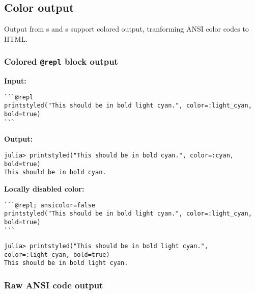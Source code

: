 \subsection{Color output}



\label{17347250707405175741}{}


Output from s and s support colored output, tranforming ANSI color codes to HTML.



\subsubsection{Colored \texttt{@repl} block output}



\label{681009610151884915}{}


\textbf{Input:}




\begin{lstlisting}
```@repl
printstyled("This should be in bold light cyan.", color=:light_cyan, bold=true)
```
\end{lstlisting}



\textbf{Output:}




\begin{verbatim}
julia> printstyled("This should be in bold cyan.", color=:cyan, bold=true)
This should be in bold cyan.
\end{verbatim}



\textbf{Locally disabled color:}




\begin{lstlisting}
```@repl; ansicolor=false
printstyled("This should be in bold light cyan.", color=:light_cyan, bold=true)
```
\end{lstlisting}




\begin{verbatim}
julia> printstyled("This should be in bold light cyan.", color=:light_cyan, bold=true)
This should be in bold light cyan.
\end{verbatim}



\subsubsection{Raw ANSI code output}



